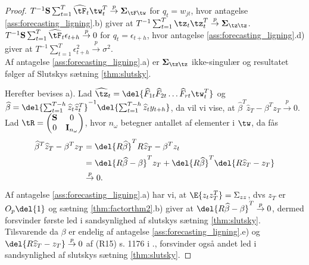 \begin{proof}
\(T^{-1} \mathbf{S} \sum_{t=1}^T \widehat{\tF}_t \tw_t^T \overset{p}{\rightarrow} \boldsymbol{\Sigma}_{\tF \tw}\) for \(q_t = w_{jt}\), hvor antagelse \ref{ass:forecasting_ligning}.b) giver at \(T^{-1} \sum_{t=1}^T \tz_t \tz_t^T \overset{p}{\rightarrow} \boldsymbol{\Sigma}_{\tz \tz}\). \\
\(T^{-1} \mathbf{S} \sum_{t=1}^T \widehat{\tF}_t \epsilon_{t+h} \overset{p}{\rightarrow} 0\) for \(q_t = \epsilon_{t+h}\), hvor antagelse \ref{ass:forecasting_ligning}.d) giver at \(T^{-1} \sum_{t=1}^T \epsilon_{t+h}^2 \overset{p}{\rightarrow} \sigma^2\). \\
Af antagelse \ref{ass:forecasting_ligning}.a) er \(\boldsymbol{\Sigma}_{\tz \tz}\) ikke-singulær og resultatet følger af Slutskys sætning \ref{thm:slutsky}.

Herefter bevises a).
Lad \(\widehat{\tz}_t = \del{\widehat{F}_{1t} \widehat{F}_{2t} \dots \widehat{F}_{rt} \tw_t^T}\) og \(\widehat{\beta} = \del{\sum_{t=1}^{T-h} \widehat{z}_t \widehat{z}_t^T}^{-1} \del{\sum_{t=1}^{T-h} \widehat{z}_t y_{t+h}}\), da vil vi vise, at \(\widehat{\beta}^T \widehat{z}_T - \beta^T z_T \overset{p}{\rightarrow} 0\).
Lad \(\tR = \begin{pmatrix}
\mathbf{S} & 0 \\ 0 & \mathbf{I}_{n_\omega}
\end{pmatrix}\), hvor \(n_\omega\) betegner antallet af elementer i \(\tw\), da fås
\begin{align*}
\widehat{\beta}^T \widehat{z}_T - \beta^T z_T &= \del{R \widehat{\beta}}^T R \widehat{z}_T - \beta^T z_t \\
&= \del{R \widehat{\beta} - \beta}^T z_T + \del{R \widehat{\beta}}^T \del{R \widehat{z}_T - z_T} \\
&\overset{p}{\rightarrow} 0.
\end{align*}
Af antagelse \ref{ass:forecasting_ligning}.a) har vi, at \(\E{z_t z_T^T} = \Sigma_{zz}\), dvs \(z_T\) er \(O_p \del{1}\) og sætning \ref{thm:factorthm2}.b) giver at \(\del{R \widehat{\beta} - \beta}^T \overset{p}{\rightarrow} 0\), dermed forsvinder første led i sandsynlighed af slutskys sætning \ref{thm:slutsky}.
Tilsvarende da \(\beta\) er endelig af antagelse \ref{ass:forecasting_ligning}.e) og \(\del{R \widehat{z}_T - z_T} \overset{p}{\rightarrow} 0\) af (R15) s. 1176 i \citep{stock_watson_2002a}., forsvinder også andet led i sandsynlighed af slutskys sætning \ref{thm:slutsky}. 
\end{proof}

